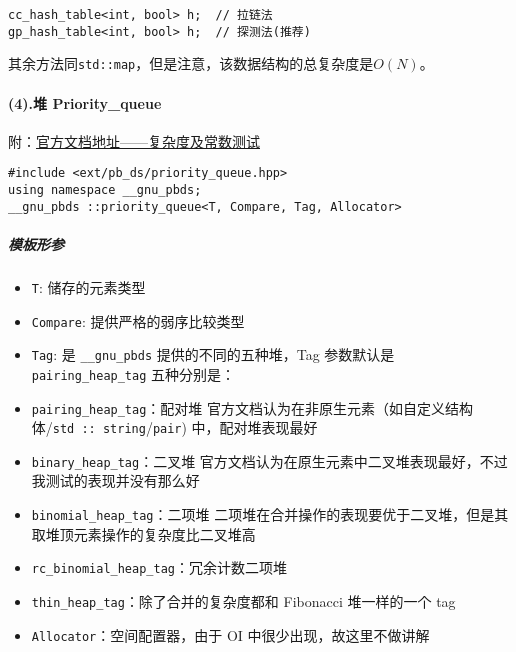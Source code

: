 \documentclass[]{article}
\providecommand{\tightlist}{%
  \setlength{\itemsep}{0pt}\setlength{\parskip}{0pt}}
\let\oldparagraph\paragraph
\renewcommand{\paragraph}[1]{\oldparagraph{#1}\mbox{}}
\let\oldsubparagraph\subparagraph
\renewcommand{\subparagraph}[1]{\oldsubparagraph{#1}\mbox{}}
\begin{document}
\begin{verbatim}
cc_hash_table<int, bool> h;  // 拉链法
gp_hash_table<int, bool> h;  // 探测法(推荐)
\end{verbatim}

其余方法同\texttt{std::map}，但是注意，该数据结构的总复杂度是\(O(N)\)。

\hypertarget{ux5806-priority_queue}{%
\paragraph{(4).堆 Priority\_queue}\label{ux5806-priority_queue}}

附：\href{https://gcc.gnu.org/onlinedocs/libstdc++/ext/pb_ds/pq_performance_tests.html\#std_mod1}{官方文档地址------复杂度及常数测试}

\begin{verbatim}
#include <ext/pb_ds/priority_queue.hpp>
using namespace __gnu_pbds;
__gnu_pbds ::priority_queue<T, Compare, Tag, Allocator>
\end{verbatim}

\hypertarget{ux6a21ux677fux5f62ux53c2-1}{%
\subparagraph{模板形参}\label{ux6a21ux677fux5f62ux53c2-1}}

\begin{itemize}
\tightlist
\item
  \texttt{T}: 储存的元素类型
\item
  \texttt{Compare}: 提供严格的弱序比较类型
\item
  \texttt{Tag}: 是 \texttt{\_\_gnu\_pbds} 提供的不同的五种堆，Tag
  参数默认是 \texttt{pairing\_heap\_tag} 五种分别是：
\item
  \texttt{pairing\_heap\_tag}：配对堆
  官方文档认为在非原生元素（如自定义结构体/\texttt{std\ ::\ string}/\texttt{pair})
  中，配对堆表现最好
\item
  \texttt{binary\_heap\_tag}：二叉堆
  官方文档认为在原生元素中二叉堆表现最好，不过我测试的表现并没有那么好
\item
  \texttt{binomial\_heap\_tag}：二项堆
  二项堆在合并操作的表现要优于二叉堆，但是其取堆顶元素操作的复杂度比二叉堆高
\item
  \texttt{rc\_binomial\_heap\_tag}：冗余计数二项堆
\item
  \texttt{thin\_heap\_tag}：除了合并的复杂度都和 Fibonacci 堆一样的一个
  tag
\item
  \texttt{Allocator}：空间配置器，由于 OI 中很少出现，故这里不做讲解
\end{itemize}
\end{document}
